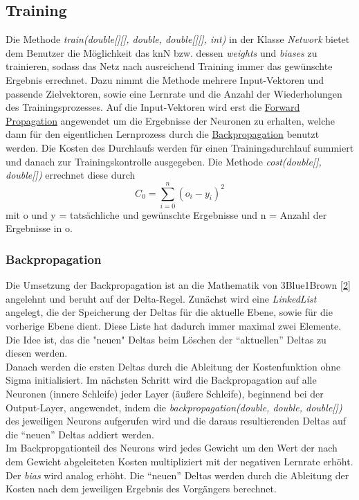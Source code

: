 \documentclass[paper=A4,pagesize=auto,12pt,headinclude=true,footinclude=true,BCOR=0mm,DIV=calc]{scrartcl}
\begin{document}
\subsection{Training}
Die Methode \textit{train(double[][], double, double[][], int)} in der Klasse \textit{Network} bietet dem Benutzer die Möglichkeit das knN bzw. dessen \textit{weights} und \textit{biases} zu trainieren, sodass das Netz nach ausreichend Training immer das gewünschte Ergebnis errechnet. Dazu nimmt die Methode mehrere Input-Vektoren und passende Zielvektoren, sowie eine Lernrate und die Anzahl der Wiederholungen des Trainingsprozesses. Auf die Input-Vektoren wird erst die \hyperlink{forwardprop}{Forward Propagation} angewendet um die Ergebnisse der Neuronen zu erhalten, welche dann für den eigentlichen Lernprozess durch die \hyperlink{backprop}{Backpropagation} benutzt werden. Die Kosten des Durchlaufs werden für einen Trainingsdurchlauf summiert und danach zur Trainingskontrolle ausgegeben. Die Methode \textit{cost(double[], double[])} errechnet diese durch
\begin{equation}
	C_0 = \sum_{i=0}^{n} (o_{i} - y_{i})^2
\end{equation}
\cite{3b1b} mit o und y = tatsächliche und gewünschte Ergebnisse und n = Anzahl der Ergebnisse in o.


\hypertarget{backprop}{\subsubsection{Backpropagation}}
Die Umsetzung der Backpropagation ist an die Mathematik von 3Blue1Brown \hyperlink{2}{[2]} angelehnt und beruht auf der Delta-Regel. Zunächst wird eine \textit{LinkedList} angelegt, die der Speicherung der Deltas für die aktuelle Ebene, sowie für die vorherige Ebene dient. Diese Liste hat dadurch immer maximal zwei Elemente. Die Idee ist, das die "neuen" Deltas beim Löschen der “aktuellen” Deltas zu diesen werden.\\Danach werden die ersten Deltas durch die Ableitung der Kostenfunktion ohne Sigma initialisiert. Im nächsten Schritt wird die Backpropagation auf alle Neuronen (innere Schleife) jeder Layer (äußere Schleife), beginnend bei der Output-Layer, angewendet, indem die \textit{backpropagation(double, double, double[])} des jeweiligen Neurons aufgerufen wird und die daraus resultierenden Deltas auf die “neuen” Deltas addiert werden.\\Im Backpropgationteil des Neurons wird jedes Gewicht um den Wert der nach dem Gewicht abgeleiteten Kosten multipliziert mit der negativen Lernrate erhöht. Der \textit{bias} wird analog erhöht. Die “neuen” Deltas werden durch die Ableitung der Kosten nach dem jeweiligen Ergebnis des Vorgängers berechnet.
\end{document}
